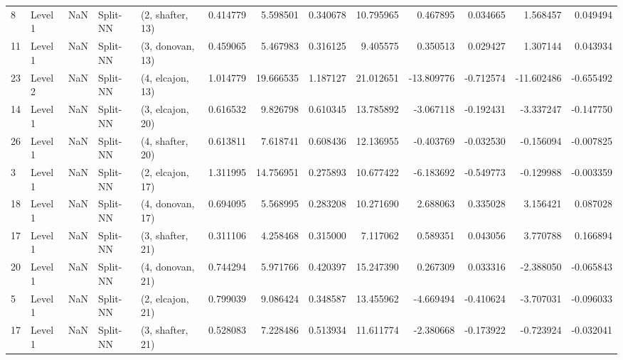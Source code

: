 \begin{tabular}{llrllrrrrrrrr}
8  &   Level 1 &    NaN &       Split-NN &  (2, shafter, 13) &   0.414779 &   5.598501 &  0.340678 &  10.795965 &             0.467895 &               0.034665 &            1.568457 &              0.049494 \\
11 &   Level 1 &    NaN &       Split-NN &  (3, donovan, 13) &   0.459065 &   5.467983 &  0.316125 &   9.405575 &             0.350513 &               0.029427 &            1.307144 &              0.043934 \\
23 &   Level 2 &    NaN &       Split-NN &  (4, elcajon, 13) &   1.014779 &  19.666535 &  1.187127 &  21.012651 &           -13.809776 &              -0.712574 &          -11.602486 &             -0.655492 \\
14 &   Level 1 &    NaN &       Split-NN &  (3, elcajon, 20) &   0.616532 &   9.826798 &  0.610345 &  13.785892 &            -3.067118 &              -0.192431 &           -3.337247 &             -0.147750 \\
26 &   Level 1 &    NaN &       Split-NN &  (4, shafter, 20) &   0.613811 &   7.618741 &  0.608436 &  12.136955 &            -0.403769 &              -0.032530 &           -0.156094 &             -0.007825 \\
3  &   Level 1 &    NaN &       Split-NN &  (2, elcajon, 17) &   1.311995 &  14.756951 &  0.275893 &  10.677422 &            -6.183692 &              -0.549773 &           -0.129988 &             -0.003359 \\
18 &   Level 1 &    NaN &       Split-NN &  (4, donovan, 17) &   0.694095 &   5.568995 &  0.283208 &  10.271690 &             2.688063 &               0.335028 &            3.156421 &              0.087028 \\
17 &   Level 1 &    NaN &       Split-NN &  (3, shafter, 21) &   0.311106 &   4.258468 &  0.315000 &   7.117062 &             0.589351 &               0.043056 &            3.770788 &              0.166894 \\
20 &   Level 1 &    NaN &       Split-NN &  (4, donovan, 21) &   0.744294 &   5.971766 &  0.420397 &  15.247390 &             0.267309 &               0.033316 &           -2.388050 &             -0.065843 \\
5  &   Level 1 &    NaN &       Split-NN &  (2, elcajon, 21) &   0.799039 &   9.086424 &  0.348587 &  13.455962 &            -4.669494 &              -0.410624 &           -3.707031 &             -0.096033 \\
17 &   Level 1 &    NaN &       Split-NN &  (3, shafter, 21) &   0.528083 &   7.228486 &  0.513934 &  11.611774 &            -2.380668 &              -0.173922 &           -0.723924 &             -0.032041 \\

\end{tabular}
